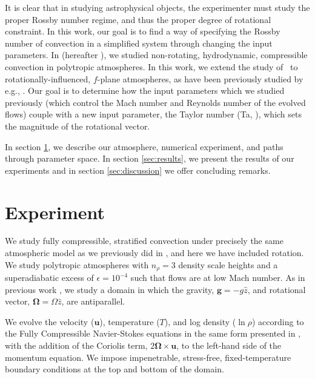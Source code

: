 \documentclass[twocolumn, amsmath, amsfonts, amssymb]{aastex62}
\begin{document}
It is clear that in studying astrophysical objects, the experimenter must 
study the proper Rossby number regime, and thus the proper degree of rotational
constraint.  In this work, our goal is to find a way of specifying the Rossby number
of convection in a simplified system through changing the input parameters.
In \cite{anders&brown2017} (hereafter \AB), we studied non-rotating, hydrodynamic, 
compressible convection in polytropic atmospheres. 
In this work, we extend the study of \AB$\,$ to rotationally-influenced, $f$-plane
atmospheres, as have been previously studied by e.g.,
\cite{brummell&all1996, brummell&all1998, calkins&all2015a}. Our goal is to determine
how the input parameters which we studied previously (which control the Mach number and
Reynolds number of the evolved flows) couple with a new input
parameter, the Taylor number (Ta, \cite{julien&all1996}), which sets the magnitude of the
rotational vector. 

In section  \ref{sec:experiment}, we describe our atmosphere, numerical
experiment, and paths through parameter space. In section \ref{sec:results}, we present
the results of our experiments and in section \ref{sec:discussion} we offer concluding remarks.

\section{Experiment} 
\label{sec:experiment}
We study fully compressible, stratified 
convection under precisely the same atmospheric model
as we previously did in \AB, and here
we have included rotation. We study polytropic atmospheres
with $n_\rho = 3$ density scale heights and a superadiabatic
excess of $\epsilon = 10^{-4}$ such that flows are at low Mach number.
As in previous work \citep{julien&all1996, brummell&all1996}, 
we study a domain in which the
gravity, $\bm{g} = -g\hat{z}$, and rotational vector, $\bm{\Omega} = \Omega \hat{z}$, 
are antiparallel.

We evolve the velocity ($\bm{u}$), temperature ($T$), 
and log density ($\ln\rho$) according to the
Fully Compressible Navier-Stokes equations in the same form presented in \AB, with the
addition of the Coriolis term, $2\bm{\Omega}\times\bm{u}$, to the left-hand side
of the momentum equation. We impose impenetrable, stress-free, fixed-temperature boundary
conditions at the top and bottom of the domain.
\end{document}
